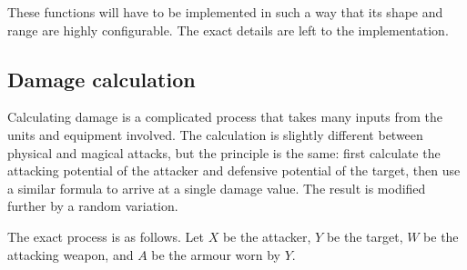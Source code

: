 These functions will have to be implemented in such a way that its shape and range are highly configurable. The exact details are left to the implementation.

\subsection{Damage calculation}
\label{sub:dmgcalc}

Calculating damage is a complicated process that takes many inputs from the units and equipment involved. The calculation is slightly different between physical and magical attacks, but the principle is the same: first calculate the attacking potential of the attacker and defensive potential of the target, then use a similar formula to arrive at a single damage value. The result is modified further by a random variation.

The exact process is as follows. Let $X$ be the attacker, $Y$ be the target, $W$ be the attacking weapon, and $A$ be the armour worn by $Y$.

